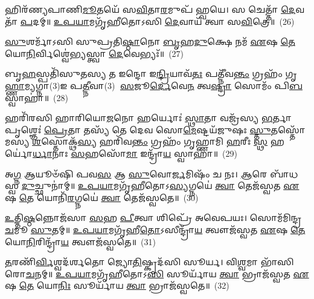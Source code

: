 {\anuvakamend[{𑌅𑌦᳴𑌬𑍍𑌧𑍇\-\ul{𑌭𑌿}\-𑌸𑍍𑌤𑍍𑌰𑌯𑍋᳴𑌵𑌿𑍞𑌶𑌤𑌿𑌃}]}%

𑌹𑌿𑌰᳴𑌣𑍍𑌯𑌪𑌾𑌣𑌿\-\ul{𑌮𑍂}\-𑌤𑌯𑍇᳴ 𑌸\-\ul{𑌵𑌿}\-𑌤𑌾\-\ul{𑌰}\-𑌮𑍁𑌪᳴ 𑌹𑍍𑌵𑌯𑍇। 𑌸 𑌚𑍇𑌤𑍍𑌤𑌾᳴ \ul{𑌦𑍇}\-𑌵𑌤𑌾᳴ \ul{𑌪}\-𑌦𑌮𑍍॥ \ul{𑌉}\-\-\ul{𑌪}\-\-\ul{𑌯𑌾}\-𑌮𑌗𑍃᳴𑌹𑍀𑌤𑍋\-𑌽𑌸𑌿 \ul{𑌦𑍇}\-𑌵𑌾𑌯᳴ 𑌤𑍍𑌵𑌾 𑌸\-\ul{𑌵𑌿}\-𑌤𑍍𑌰𑍇॥~(26)

{\anuvakamend[{𑌹𑌿𑌰᳴𑌣𑍍𑌯𑌪𑌾\-\ul{𑌣𑌿𑌂} 𑌚𑌤𑍁᳴𑌰𑍍𑌦𑌶}]}%

\-\ul{𑌸𑍁}\-𑌶𑌰𑍍𑌮𑌾᳴\-𑌽𑌸𑌿 𑌸𑍁𑌪𑍍𑌰𑌤𑌿\-\ul{𑌷𑍍𑌠𑌾}\-𑌨𑍋 \ul{𑌬𑍃}\-𑌹\-\ul{𑌦𑍁}\-𑌕𑍍𑌷𑍇 𑌨𑌮᳴ \ul{𑌏}\-𑌷 \ul{𑌤𑍇} 𑌯𑍋\-\ul{𑌨𑌿}\-𑌰𑍍𑌵𑌿𑌶𑍍𑌵𑍇॑𑌭𑍍𑌯𑌸𑍍𑌤𑍍𑌵𑌾 \ul{𑌦𑍇}\-𑌵𑍇𑌭𑍍𑌯𑌃᳴॥~(27)

{\anuvakamend[{\-\ul{𑌸𑍁}\-𑌶\-\ul{𑌰𑍍𑌮𑌾} 𑌦𑍍𑌵𑌾𑌦᳴𑌶}]}%

𑌬𑍃\-\ul{𑌹}\-𑌸𑍍𑌪𑌤𑌿᳴𑌸𑍁𑌤𑌸𑍍𑌯 𑌤 𑌇𑌨𑍍𑌦𑍋 𑌇\-\ul{𑌨𑍍𑌦𑍍𑌰𑌿}\-𑌯𑌾𑌵᳴\-\ul{𑌤𑌃} 𑌪𑌤𑍍𑌨𑍀᳴𑌵\-\ul{𑌨𑍍𑌤𑌂} 𑌗𑍍𑌰𑌹𑌂᳴ 𑌗𑍃\-\ul{𑌹𑍍𑌣𑌾}\-𑌮𑍍𑌯𑌗𑍍𑌨𑌾(3)𑌇 𑌪\-\ul{𑌤𑍍𑌨𑍀}\-𑌵𑌾(3)𑌃 \ul{𑌸}\-𑌜𑍂\-\ul{𑌰𑍍𑌦𑍇}\-𑌵𑍇\-\ul{𑌨} 𑌤𑍍𑌵\-\ul{𑌷𑍍𑌟𑍍𑌰𑌾} 𑌸𑍋𑌮𑌂᳴ 𑌪𑌿\-\ul{𑌬} 𑌸𑍍𑌵𑌾𑌹𑌾॑॥~(28)

{\anuvakamend[{𑌬𑍃\-\ul{𑌹}\-𑌸𑍍𑌪𑌤𑌿᳴𑌸𑍁𑌤\-\ul{𑌸𑍍𑌯} 𑌪𑌞𑍍𑌚᳴𑌦𑌶}]}%

𑌹𑌰𑌿᳴𑌰𑌸𑌿 𑌹𑌾𑌰𑌿𑌯𑍋\-\ul{𑌜}\-𑌨𑍋 𑌹𑌰𑍍𑌯𑍋𑌃॑ \ul{𑌸𑍍𑌥𑌾}\-𑌤𑌾 𑌵𑌜𑍍𑌰᳴𑌸𑍍𑌯 \ul{𑌭}\-𑌰𑍍𑌤𑌾 𑌪𑍃𑌶𑍍𑌞𑍇𑌃॑ \ul{𑌪𑍍𑌰𑍇}\-𑌤𑌾 𑌤𑌸𑍍𑌯᳴ 𑌤𑍇 𑌦𑍇𑌵 𑌸𑍋\-\ul{𑌮𑍇}\-𑌷𑍍𑌟𑌯᳴𑌜𑍁𑌷𑌃 \ul{𑌸𑍍𑌤𑍁}\-𑌤𑌸𑍍𑌤𑍋᳴𑌮𑌸𑍍𑌯 \ul{𑌶}\-𑌸𑍍𑌤𑍋𑌕𑍍𑌥᳴\-\ul{𑌸𑍍𑌯} 𑌹𑌰𑌿᳴𑌵\-\ul{𑌨𑍍𑌤𑌂} 𑌗𑍍𑌰𑌹𑌂᳴ 𑌗𑍃𑌹𑍍𑌣𑌾𑌮𑌿 \ul{𑌹}\-𑌰𑍀𑌃 \ul{𑌸𑍍𑌥} 𑌹𑌰𑍍𑌯𑍋॑\-\ul{𑌰𑍍𑌧𑌾}\-𑌨𑌾𑌃 \ul{𑌸}\-𑌹𑌸𑍋᳴\-\ul{𑌮𑌾} 𑌇𑌨𑍍𑌦𑍍𑌰𑌾᳴\-\ul{𑌯} 𑌸𑍍𑌵𑌾𑌹𑌾॑॥~(29)

{\anuvakamend[{𑌹\-\ul{𑌰𑌿𑌃} 𑌷𑌡𑍍𑌵𑌿𑍞᳴𑌶𑌤𑌿𑌃}]}%

𑌅\-\ul{𑌗𑍍𑌨} 𑌆𑌯𑍂𑍞᳴𑌷𑌿 𑌪𑌵\-\ul{𑌸} 𑌆 \ul{𑌸𑍁}\-𑌵𑍋\-\ul{𑌰𑍍𑌜}\-𑌮𑌿𑌷𑌂᳴ 𑌚 𑌨𑌃। \ul{𑌆}\-𑌰𑍇 𑌬𑌾᳴𑌧𑌸𑍍𑌵 \ul{𑌦𑍁}\-𑌚𑍍𑌛𑍁𑌨𑌾॑𑌮𑍍॥ \ul{𑌉}\-\-\ul{𑌪}\-\-\ul{𑌯𑌾}\-𑌮𑌗𑍃᳴𑌹𑍀𑌤𑍋\-𑌽\-\ul{𑌸𑍍𑌯}\-𑌗𑍍𑌨𑌯𑍇॑ \ul{𑌤𑍍𑌵𑌾} 𑌤𑍇𑌜᳴𑌸𑍍𑌵𑌤 \ul{𑌏}\-𑌷 \ul{𑌤𑍇} 𑌯𑍋𑌨𑌿᳴\-\ul{𑌰}\-𑌗𑍍𑌨𑌯𑍇॑ \ul{𑌤𑍍𑌵𑌾} 𑌤𑍇𑌜᳴𑌸𑍍𑌵𑌤𑍇॥~(30)

{\anuvakamend[{𑌅\-\ul{𑌗𑍍𑌨} 𑌆𑌯𑍂𑍞᳴\-\ul{𑌷𑌿} 𑌤𑍍𑌰𑌯𑍋᳴𑌵𑌿 𑍞𑌶𑌤𑌿𑌃}]}%

\-\ul{𑌉}\-𑌤𑍍𑌤𑌿\-\ul{𑌷𑍍𑌠}\-𑌨𑍍𑌨𑍋𑌜᳴𑌸𑌾 \ul{𑌸}\-𑌹 \ul{𑌪𑍀}\-𑌤𑍍𑌵𑌾 𑌶𑌿𑌪𑍍𑌰𑍇᳴ 𑌅𑌵𑍇𑌪𑌯𑌃। 𑌸𑍋𑌮᳴𑌮𑌿𑌨𑍍𑌦𑍍𑌰 \ul{𑌚}\-𑌮𑍂 \ul{𑌸𑍁}\-𑌤𑌮𑍍॥ \ul{𑌉}\-\-\ul{𑌪}\-\-\ul{𑌯𑌾}\-𑌮𑌗𑍃᳴𑌹𑍀\-\ul{𑌤𑍋}\-\-𑌽𑌸𑍀𑌨𑍍𑌦𑍍𑌰𑌾᳴\-\ul{𑌯} 𑌤𑍍𑌵𑍗𑌜᳴𑌸𑍍𑌵𑌤 \ul{𑌏}\-𑌷 \ul{𑌤𑍇} 𑌯𑍋\-\ul{𑌨𑌿}\-𑌰𑌿𑌨𑍍𑌦𑍍𑌰𑌾᳴\-\ul{𑌯} 𑌤𑍍𑌵𑍗𑌜᳴𑌸𑍍𑌵𑌤𑍇॥~(31)

{\anuvakamend[{\-\ul{𑌉}\-𑌤𑍍𑌤𑌿\-\ul{𑌷𑍍𑌠}\-𑌨𑍍𑌨𑍇𑌕᳴𑌵𑌿𑍞𑌶𑌤𑌿𑌃}]}%

\-\ul{𑌤}\-𑌰𑌣𑌿᳴\-\ul{𑌰𑍍𑌵𑌿}\-𑌶𑍍𑌵𑌦᳴𑌰𑍍\mbox{}𑌶𑌤𑍋 𑌜𑍍𑌯𑍋\-\ul{𑌤𑌿}\-𑌷𑍍𑌕𑍃𑌦᳴𑌸𑌿 𑌸𑍂𑌰𑍍𑌯। 𑌵𑌿\-\ul{𑌶𑍍𑌵}\-𑌮𑌾 𑌭𑌾᳴𑌸𑌿 𑌰𑍋\-\ul{𑌚}\-𑌨𑌮𑍍॥ \ul{𑌉}\-\-\ul{𑌪}\-\-\ul{𑌯𑌾}\-𑌮𑌗𑍃᳴𑌹𑍀𑌤𑍋\-𑌽\-\ul{𑌸𑌿} 𑌸𑍂𑌰𑍍𑌯𑌾᳴𑌯 \ul{𑌤𑍍𑌵𑌾} 𑌭𑍍𑌰𑌾𑌜᳴𑌸𑍍𑌵𑌤 \ul{𑌏}\-𑌷 \ul{𑌤𑍇} 𑌯𑍋\-\ul{𑌨𑌿𑌃} 𑌸𑍂𑌰𑍍𑌯𑌾᳴𑌯 \ul{𑌤𑍍𑌵𑌾} 𑌭𑍍𑌰𑌾𑌜᳴𑌸𑍍𑌵𑌤𑍇॥~(32)

